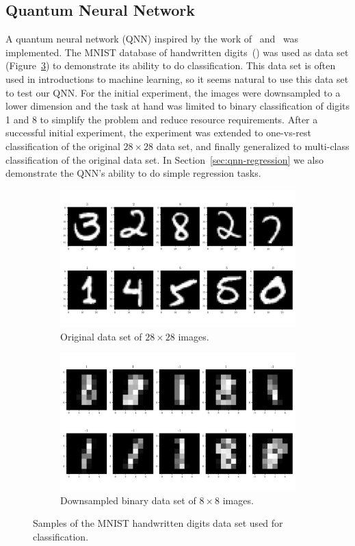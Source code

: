 \documentclass[a4paper,10pt]{article}
\begin{document}
\subsection{Quantum Neural Network}
A quantum neural network (QNN) inspired by the work of~\textcite{qnn-near-term} and~\textcite{perez2019data} was implemented.
The MNIST database of handwritten digits~(\cite{mnist-digits}) was used as data set (Figure~\ref{fig:mnist}) to demonstrate its ability to do classification.
This data set is often used in introductions to machine learning, so it seems natural to use this data set to test our QNN.
For the initial experiment, the images were downsampled to a lower dimension and the task at hand was limited to binary classification of digits 1 and 8 to simplify the problem and reduce resource requirements.
After a successful initial experiment, the experiment was extended to one-vs-rest classification of the original $28 \times 28$ data set, and finally generalized to multi-class classification of the original data set.
In Section~\ref{sec:qnn-regression} we also demonstrate the QNN's ability to do simple regression tasks.
\begin{figure}[ht]
	\centering
	\begin{subfigure}{.5\textwidth}
		\centering
		\includegraphics[width=.925\linewidth]{figures/mnist_28x28.pdf}
		\caption{Original data set of $28 \times 28$ images.}
		\label{fig:mnist_28x28}
	\end{subfigure}%
	\begin{subfigure}{.5\textwidth}
		\centering
		\includegraphics[width=.925\linewidth]{figures/mnist_8x8.pdf}
		\caption{Downsampled binary data set of $8 \times 8$ images.}
		\label{fig:mnist_8x8}
	\end{subfigure}
	\caption{Samples of the MNIST handwritten digits data set used for classification.}
	\label{fig:mnist}
\end{figure}
\end{document}

